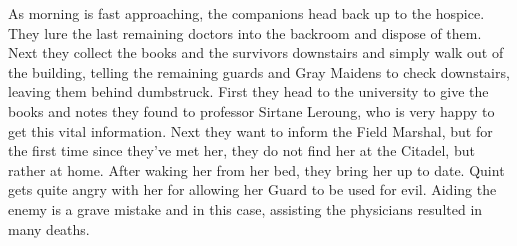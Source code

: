 As morning is fast approaching, the companions head back up to the hospice. They lure the last remaining doctors into the backroom and dispose of them. Next they collect the books and the survivors downstairs and simply walk out of the building, telling the remaining guards and Gray Maidens to check downstairs, leaving them behind dumbstruck. First they head to the university to give the books and notes they found to professor Sirtane Leroung, who is very happy to get this vital information. Next they want to inform the Field Marshal, but for the first time since they've met her, they do not find her at the Citadel, but rather at home. After waking her from her bed, they bring her up to date. Quint gets quite angry with her for allowing her Guard to be used for evil. Aiding the enemy is a grave mistake and in this case, assisting the physicians resulted in many deaths.\\

